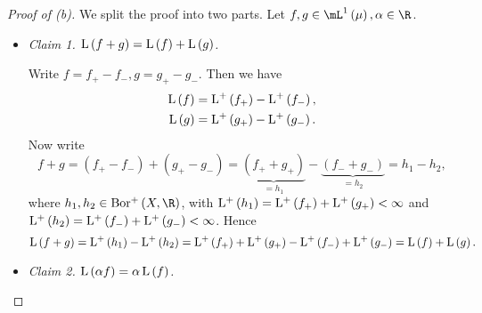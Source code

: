\documentclass[pmath450]{subfiles}
\begin{document}
    \begin{proof}[Proof of (b)]
        We split the proof into two parts. Let $f,g\in\mL^{1}\left( \mu \right), \alpha\in\R$.
        \begin{itemize}
            \item \textit{Claim 1. $\operatorname{L}\left( f+g \right)=\operatorname{L}\left( f \right)+\operatorname{L}\left( g \right)$.}

                \begin{subproof}
                    Write $f=f_+-f_-, g=g_+-g_-$. Then we have
                    \begin{equation*}
                        \begin{aligned}
                            \operatorname{L}\left( f \right) & = \operatorname{L^+}\left( f_+ \right) - \operatorname{L^+}\left( f_- \right), \\
                            \operatorname{L}\left( g \right) & = \operatorname{L^+}\left( g_+ \right) - \operatorname{L^+}\left( g_- \right).
                        \end{aligned} 
                    \end{equation*}
                    Now write
                    \begin{equation*}
                        f+g = \left( f_+-f_- \right) + \left( g_+-g_- \right) = \underbrace{\left( f_++g_+ \right)}_{=h_1}-\underbrace{\left( f_-+g_- \right)}_{=h_2} = h_1-h_2,
                    \end{equation*}
                    where $h_1,h_2\in\borplus\left( X,\R \right)$, with $\operatorname{L^+}\left( h_1 \right) = \operatorname{L^+}\left( f_+ \right)+\operatorname{L^+}\left( g_+ \right)<\infty$ and $\operatorname{L^+}\left( h_2 \right) = \operatorname{L^+}\left( f_- \right)+\operatorname{L^+}\left( g_- \right)<\infty$. Hence 
                    \begin{equation*}
                        \operatorname{L}\left( f+g \right) = \operatorname{L^+}\left( h_1 \right)-\operatorname{L^+}\left( h_2 \right) = \operatorname{L^+}\left( f_+ \right)+\operatorname{L^+}\left( g_+ \right)-\operatorname{L^+}\left( f_- \right)+\operatorname{L^+}\left( g_- \right) = \operatorname{L}\left( f \right)+\operatorname{L}\left( g \right).
                    \end{equation*}
                \end{subproof}

            \item \textit{Claim 2. $\operatorname{L}\left( \alpha f \right)=\alpha\operatorname{L}\left( f \right)$.}


\end{itemize}
\end{proof}
\end{document}
